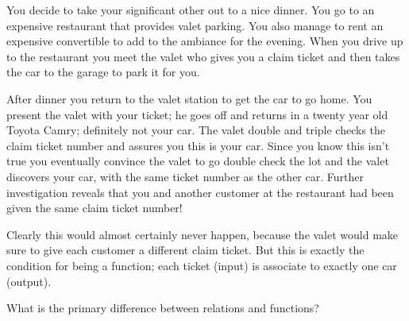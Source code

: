 \documentclass{ximera}
\begin{document}
    \begin{explanation}
        You decide to take your significant other out to a nice dinner. You go to an expensive restaurant that provides valet parking. You also manage to rent an expensive convertible to add to the ambiance for the evening. When you drive up to the restaurant you meet the valet who gives you a claim ticket and then takes the car to the garage to park it for you.
    
        After dinner you return to the valet station to get the car to go home. You present the valet with your ticket; he goes off and returns in a twenty year old Toyota Camry; definitely not your car. The valet double and triple checks the claim ticket number and assures you this is your car. Since you know this isn't true you eventually convince the valet to go double check the lot and the valet discovers your car, with the same ticket number as the other car. Further investigation reveals that you and another customer at the restaurant had been given the same claim ticket number!
    \end{explanation}
        
    Clearly this would almost certainly never happen, because the valet would make sure to give each customer a different claim ticket. But this is exactly the condition for being a function; each ticket (input) is associate to exactly one car (output).
    
    
    \begin{problem}
        What is the primary difference between relations and functions?
        \begin{multipleChoice}
        \end{multipleChoice}
        
    \end{problem}
\end{document}
